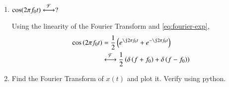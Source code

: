 \documentclass[journal,12pt,twocolumn]{IEEEtran}
\renewcommand\thesection{\arabic{section}}
\begin{document}
\begin{enumerate}[label=\thesection.\arabic*
,ref=\thesection.\theenumi]
\solution Suppose $g(t)\system{F}G(f)$. Then,
\begin{align}
    g(t)e^{\j2\pi f_0t}&\system{F}\int_{-\infty}^{\infty}
                       g(t)e^{-\j2\pi\brak{f-f_0}t}\, dt \\
                       &=F(f-f_0)
                       \label{eq:f-shift}
\end{align}
Using \eqref{eq:duality} in \eqref{eq:fourier-delta}, $1\system{F}\delta(-f)$.
Hence, applying \eqref{eq:f-shift},
\begin{align}
    e^{-\j2\pi f_0t}\system{F}\delta(-(f+f_0)) = \delta(f+f_0)
    \label{eq:fourier-exp}
\end{align}
\item $\cos(2\pi f_0t)\overset{\mathcal{F}}{ \longleftrightarrow}?$

\solution Using the linearity of the Fourier 
Transform and \eqref{eq:fourier-exp},
\begin{align}
    \cos\brak{2\pi f_0t} &= \frac{1}{2}
                         \brak{e^{\j2\pi f_0t} + e^{-\j2\pi f_0t}} \\
                         &\system{F}\frac{1}{2}\brak{\delta\brak{f+f_0} + \delta\brak{f-f_0}}
\end{align}
\item Find the Fourier Transform of $x(t)$ and plot it. Verify using python.


\end{enumerate}
\end{document}
